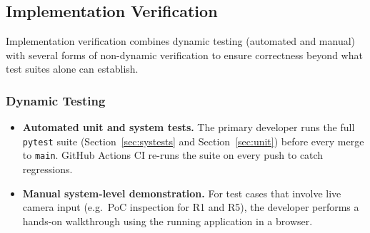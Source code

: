\documentclass[12pt, titlepage]{article}
\begin{document}
\subsection{Implementation Verification}
Implementation verification combines dynamic testing (automated and
manual) with several forms of non-dynamic verification to ensure
correctness beyond what test suites alone can establish.

\subsubsection{Dynamic Testing}
\begin{itemize}
    \item \textbf{Automated unit and system tests.} The primary
      developer runs the full \texttt{pytest} suite
      (Section~\ref{sec:systests} and Section~\ref{sec:unit}) before
      every merge to \texttt{main}. GitHub Actions CI re-runs the
      suite on every push to catch regressions.
    \item \textbf{Manual system-level demonstration.} For test cases
      that involve live camera input (e.g.\ PoC inspection for R1 and
      R5), the developer performs a hands-on walkthrough using the
      running application in a browser.
\end{itemize}
\end{document}

